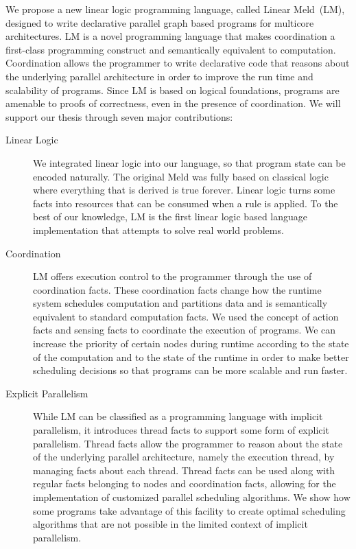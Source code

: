 
We propose a new linear logic programming language, called Linear Meld~(LM),
designed to write declarative parallel graph based programs for multicore
architectures.  LM is a novel programming language that makes coordination a
first-class programming construct and semantically equivalent to computation.
Coordination allows the programmer to write declarative code that reasons about
the underlying parallel architecture in order to improve the run time and
scalability of programs. Since LM is based on logical foundations, programs are
amenable to proofs of correctness, even in the presence of coordination. We will
support our thesis through seven major contributions:

\begin{description}
   
   \item[Linear Logic]

   We integrated linear logic into our language, so that program state can be
   encoded naturally. The original Meld was fully based on classical logic where
   everything that is derived is true forever. Linear logic turns some facts
   into resources that can be consumed when a rule is applied.  To the best of
   our knowledge, LM is the first linear logic based language implementation
   that attempts to solve real world problems.

   \item[Coordination]
   
   LM offers execution control to the programmer through the use of coordination
   facts. These coordination facts change how the runtime system schedules
   computation and partitions data and is semantically equivalent to standard
   computation facts. We used the concept of action facts and sensing facts to
   coordinate the execution of programs. We can increase the priority of certain
   nodes during runtime according to the state of the computation and to the
   state of the runtime in order to make better scheduling decisions so that
   programs can be more scalable and run faster.

   \item[Explicit Parallelism]

   While LM can be classified as a programming language with implicit
   parallelism, it introduces thread facts to support some form of explicit
   parallelism. Thread facts allow the programmer to reason about the state of
   the underlying parallel architecture, namely the execution thread, by
   managing facts about each thread. Thread facts can be used along with regular
   facts belonging to nodes and coordination facts, allowing for the
   implementation of customized parallel scheduling algorithms. We show how some
   programs take advantage of this facility to create optimal scheduling
   algorithms that are not possible in the limited context of implicit
   parallelism.
   

\end{description}
